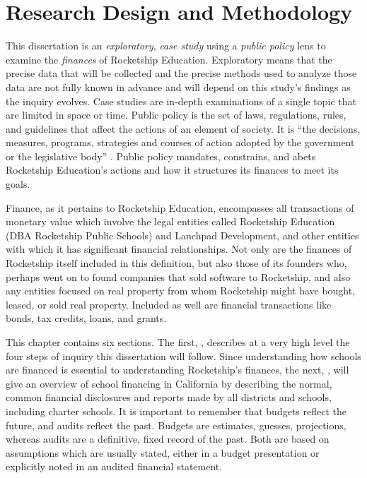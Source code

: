 
\chapter{Research Design and Methodology}\label{ch:methods}\indent

This dissertation is an \textit{exploratory}, \textit{case study} using a \textit{public policy} lens to examine the \textit{finances} of Rocketship Education. Exploratory means that the precise data that will be collected and the precise methods used to analyze those data are not fully known in advance and will depend on this study's findings as the inquiry evolves. Case studies are in-depth examinations of a single topic that are limited in space or time. Public policy is the set of laws, regulations, rules, and guidelines that affect the actions of an element of society. It is ``the decisions, measures, programs, strategies and courses of action adopted by the government or the legislative body'' \parencite[3]{Knill.Tosun2020}. Public policy mandates, constrains, and abets Rocketship Education's actions and how it structures its finances to meet its goals.

Finance, as it pertains to Rocketship Education, encompasses all transactions of monetary value which involve the legal entities called Rocketship Education (DBA Rocketship Public Schools) and Lauchpad Development, and other entities with which it has significant financial relationships. Not only are the finances of Rocketship itself included in this definition, but also those of its founders who, perhaps went on to found companies that sold software to Rocketship, and also any entities focused on real property from whom Rocketship might have bought, leased, or sold real property. Included as well are financial transactions like bonds, tax credits, loans, and grants.

This chapter contains six sections. The first, , describes at a very high level the four steps of inquiry this dissertation will follow. Since understanding how schools are financed is essential to understanding Rocketship's finances, the next, , will give an overview of school financing in California by describing the normal, common financial disclosures and reports made by all districts and schools, including charter schools. It is important to remember that budgets reflect the future, and audits reflect the past. Budgets are estimates, guesses, projections, whereas audits are a definitive, fixed record of the past. Both are based on assumptions which are usually stated, either in a budget presentation or explicitly noted in an audited financial statement.

